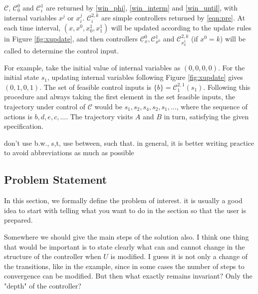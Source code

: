\begin{example}
	$ \mathcal{C} $, $ \mathcal{C}_0^0 $ and $ \mathcal{C}_i^1 $ are returned by \eqref{win_phi}, \eqref{win_interm} and \eqref{win_until}, with internal variables $ x^j$ or $ x^j_i $. $ \mathcal{C}_i^{2,k} $ are simple controllers returned by \eqref{eqn:pre}. At each time interval, $ (x,x^0,x^1_0,x^1_1) $ will be updated according to the update rules in Figure \ref{fig:xupdate}, and then controllers $\mathcal{C}_{x}^0, \mathcal{C}^1_{x^0} $ and  $\mathcal{C}^{2,k}_{x^1_{k}} $ (if $ x^0 = k $) will be called to determine the control input. %
	
	For example, take the initial value of internal variables as $ (0,0,0,0) $. For the initial state $ s_1 $, updating internal variables following Figure \ref{fig:xupdate} gives $ (0,1,0,1) $. The set of feasible control inputs is $\{b\}= \mathcal{C}^{2,1}_{1}(s_1) $. Following this procedure and always taking the first element in the set feasible inputs, the trajectory under control of $\mathcal{C} $ would be $ s_1,s_2,s_4,s_2,s_1,...$, where the sequence of actions is $ b,d,e,c,... $. The trajectory visits $ A $ and $ B $ in turn, satisfying the given specification.
	
\end{example}

{\color{blue} don't use b.w., s,t, use between, such that. in general, it is better writing practice to avoid abbreviations as much as possible}

\subsection{Problem Statement}

In this section, we formally define the problem of interest. {\color{blue}it is usually a good idea to start with telling what you want to do in the section so that the user is prepared.}

{\color{purple} Somewhere we should give the main steps of the solution also. I think one thing that would be important is to state clearly what can and cannot change in the structure of the controller when $U$ is modified. I guess it is not only a change of the transitions, like in the example, since in some cases the number of steps to convergence can be modified. But then what exactly remains invariant? Only the "depth" of the controller? }

